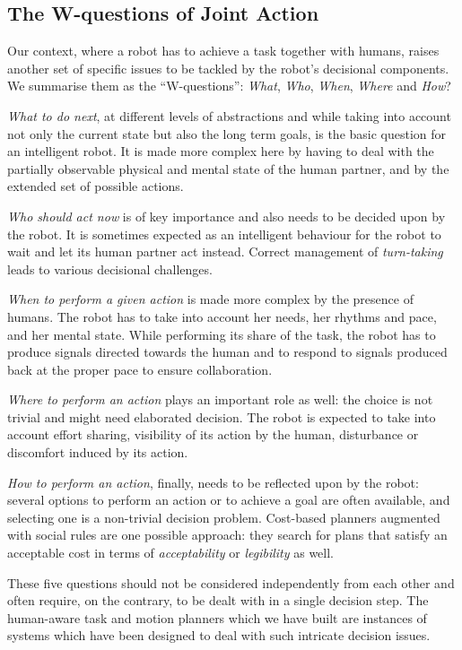 \documentclass[preprint,3p,times]{elsarticle}
\begin{document}
\subsection{The W-questions of Joint Action}

Our context, where a robot has to achieve a task together with
humans, raises another set of specific issues to be tackled by the robot's
decisional components. We summarise them as the ``W-questions'': \emph{What}, \emph{Who}, \emph{When},
\emph{Where} and \emph{How}?

\emph{What to do next}, at different levels of abstractions and while taking
into account not only the current state but also the long term goals, is the
basic question for an intelligent robot. It is made more complex here by having
to deal with the partially observable physical and mental state of the human
partner, and by the extended set of possible actions.

\emph{Who should act now} is of key importance and also needs to be
decided upon by the robot. It is sometimes expected as an intelligent behaviour
for the robot to wait and let its human partner act instead. Correct management
of \emph{turn-taking} leads to various decisional challenges.

\emph{When to perform a given action} is made more complex by the presence of
humans. The robot has to take into account her needs, her rhythms and
pace, and her mental state. While performing its share of the task, the
robot has to produce signals directed towards the human and to respond to
signals produced back at the proper pace to ensure collaboration.

\emph{Where to perform an action} plays an important role as well: the choice is
not trivial and might need elaborated decision. The robot is expected to take
into account effort sharing, visibility of its action by the human, disturbance
or discomfort induced by its action.

\emph{How to perform an action}, finally, needs to be reflected upon by the
robot: several options to perform an action or to achieve a goal are often
available, and selecting one is a non-trivial decision problem. Cost-based
planners augmented with social rules are one possible approach: they search for plans that satisfy an
acceptable cost in terms of \emph{acceptability} or \emph{legibility} as well.

These five questions should not be considered independently from each other and
often require, on the contrary, to be dealt with in a single decision step. The
human-aware task and motion planners which we have built are instances of
systems which have been designed to deal with such intricate decision issues.
\end{document}
